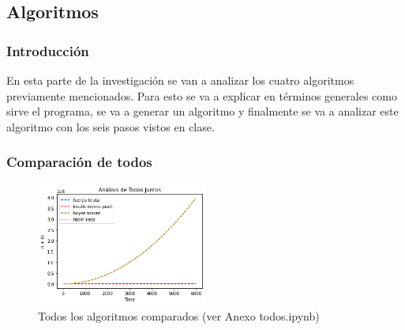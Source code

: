 \documentclass[stu, 11pt, letterpaper, donotrepeattitle, floatsintext, natbib, helv]{apa7}
\begin{document}
\begin{singlespace}




\part*{Algoritmos}

\section*{Introducción}
\quad En esta parte de la investigación se van a analizar los cuatro algoritmos previamente mencionados. Para esto se va a explicar en términos generales como sirve el programa, se va a generar un algoritmo y finalmente se va a analizar este algoritmo con los seis pasos vistos en clase.









\section*{Comparación de todos}


\begin{figure} [H]
    \includegraphics[width=0.5\textwidth]{../codigoPythonJupyter/Todos.png}
    \caption{Todos los algoritmos comparados (ver Anexo todos.ipynb)}
    \label{fig:all}
\end{figure}


\end{singlespace}
\end{document}
